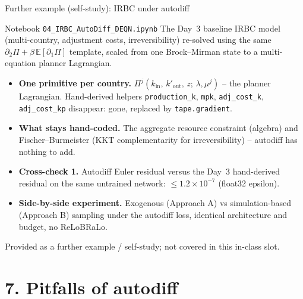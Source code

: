 \documentclass[aspectratio=169,11pt]{beamer}
\newcommand{\emphc}[1]{\textcolor{harvardcrimson}{#1}}
\begin{document}
\begin{frame}[fragile]{Further example (self-study): IRBC under autodiff}
\footnotesize
\begin{block}{Notebook \texttt{04\_IRBC\_AutoDiff\_DEQN.ipynb}}
The Day~3 baseline IRBC model (multi-country, adjustment costs, irreversibility) re-solved using the same $\partial_2\Pi + \beta\,\mathbb{E}[\partial_1\Pi]$ template, scaled from one Brock--Mirman state to a multi-equation planner Lagrangian.
\end{block}
\vspace{2pt}
\begin{itemize}\itemsep2pt
\item \textbf{One primitive per country.} \(\Pi^j(k_{\text{in}},\,k'_{\text{out}},\,z;\,\lambda,\mu^j)\) -- the planner Lagrangian. Hand-derived helpers \texttt{production\_k}, \texttt{mpk}, \texttt{adj\_cost\_k}, \texttt{adj\_cost\_kp} disappear: gone, replaced by \texttt{tape.gradient}.
\item \textbf{What stays hand-coded.} The aggregate resource constraint (algebra) and Fischer--Burmeister (KKT complementarity for irreversibility) -- autodiff has nothing to add.
\item \textbf{Cross-check 1.} Autodiff Euler residual versus the Day~3 hand-derived residual on the same untrained network: \emphc{$\le 1.2\times 10^{-7}$} (float32 epsilon).
\item \textbf{Side-by-side experiment.} Exogenous (Approach A) vs simulation-based (Approach B) sampling under the autodiff loss, identical architecture and budget, no ReLoBRaLo.
\end{itemize}
\vspace{2pt}
\centerline{\emphc{Provided as a further example / self-study; not covered in this in-class slot.}}
\end{frame}


\section*{7. Pitfalls of autodiff}
\end{document}
